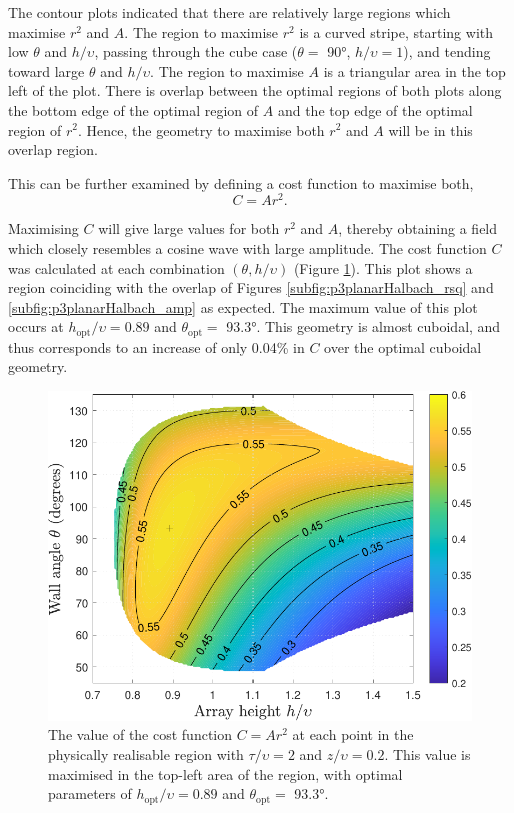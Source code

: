 The contour plots indicated that there are relatively large regions which maximise \(r^2\) and \(A\). The region to maximise \(r^2\) is a curved stripe, starting with low \(\theta\) and \(h/\upsilon\), passing through the cube case (\(\theta = \) \ang{90}, \(h/\upsilon = 1\)), and tending toward large \(\theta\) and \(h/\upsilon\). The region to maximise \(A\) is a triangular area in the top left of the plot. There is overlap between the optimal regions of both plots along the bottom edge of the optimal region of \(A\) and the top edge of the optimal region of \(r^2\). Hence, the geometry to maximise both \(r^2\) and \(A\) will be in this overlap region.

This can be further examined by defining a cost function to maximise both,
\begin{equation}\label{eqn:p3CostFunction}
C = Ar^2 \text{.}
\end{equation}

Maximising \(C\) will give large values for both \(r^2\) and \(A\), thereby obtaining a field which closely resembles a cosine wave with large amplitude. The cost function \(C\) was calculated at each combination \(\left(\theta, h/\upsilon\right)\) (Figure \ref{fig:p3planarHalbach_wavequality}). This plot shows a region coinciding with the overlap of Figures \ref{subfig:p3planarHalbach_rsq} and \ref{subfig:p3planarHalbach_amp} as expected. The maximum value of this plot occurs at \(h_\text{opt}/\upsilon = 0.89\) and \(\theta_\text{opt} =\) \ang{93.3}. This geometry is almost cuboidal, and thus corresponds to an increase of only 0.04\% in \(C\) over the optimal cuboidal geometry.
\begin{figure}
	\centering
	\includegraphics[width=0.8\linewidth]{p3/p3FIG13}
	\caption{The value of the cost function \(C = Ar^2\) at each point in the physically realisable region with \(\tau/\upsilon=2\) and \(z/\upsilon = 0.2\). This value is maximised in the top-left area of the region, with optimal parameters of \(h_\text{opt}/\upsilon = 0.89\) and \(\theta_\text{opt} = \) \ang{93.3}.}
	\label{fig:p3planarHalbach_wavequality}
\end{figure}

